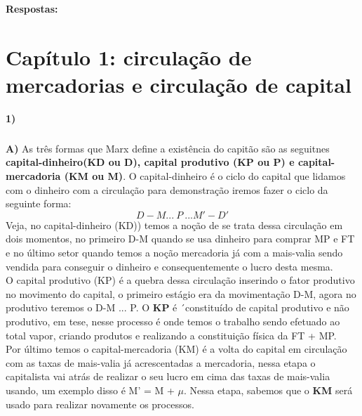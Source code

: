 \documentclass[a4paper, 12pt]{article} %
\begin{document}
\vspace{0.5cm}

\begin{center}
\textbf{Respostas:}
\end{center}

\par \section{Capítulo 1: circulação de mercadorias e circulação de capital}
\vspace{0.5cm}

\par \textbf{1)}


\subparagraph{} \textbf{A)} As três formas que Marx define a existência do capitão são as seguitnes \textbf{capital-dinheiro(KD ou D), capital produtivo (KP ou P) e capital-mercadoria (KM ou M)}. O capital-dinheiro é o ciclo do capital que lidamos com o dinheiro com a circulação para demonstração iremos fazer o ciclo da seguinte forma:
\begin{equation}
D-M... \ P \ ... M'-D'
\end{equation}
Veja, no capital-dinheiro (KD)) temos a noção de se trata dessa circulação em dois momentos, no primeiro D-M quando se usa dinheiro para comprar MP e FT e no último setor quando temos a noção mercadoria já com a mais-valia sendo vendida para conseguir o dinheiro e consequentemente o lucro desta mesma.
\\
O capital produtivo (KP) é a quebra dessa circulação inserindo o fator produtivo no movimento do capital, o primeiro estágio era da movimentação D-M, agora no produtivo teremos o D-M ... P. O \textbf{KP} é ´constituído de capital produtivo e não produtivo, em tese, nesse processo é onde temos o trabalho sendo efetuado ao total vapor, criando produtos e realizando a constituição física da FT + MP.
\\
Por último temos o capital-mercadoria (KM) é a volta do capital em circulação com as taxas de mais-valia já acrescentadas a mercadoria, nessa etapa o capitalista vai atrás de realizar o seu lucro em cima das taxas de mais-valia usando, um exemplo disso é M' = M + $\mu$. Nessa etapa, sabemos que o \textbf{KM} será usado para realizar novamente os processos.
\end{document}
